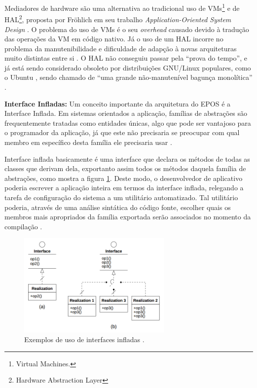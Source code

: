 Mediadores de hardware são uma alternativa ao tradicional uso de VMs\footnote{Virtual Machines.} e de HAL\footnote{Hardware Abstraction Layer}, proposta por Fröhlich em seu trabalho \emph{Application-Oriented System Design} \cite{guto_thesis}. O problema do uso de VMs é o seu \emph{overhead} causado devido à tradução das operações da VM em código nativo. Já o uso de um HAL incorre no problema da manutenibilidade e dificuldade de adapção à novas arquiteturas muito distintas entre si \cite{hw_mediators}. O HAL não conseguiu passar pela ``prova do tempo'', e já está sendo considerado obsoleto por distribuições GNU/Linux populares, como o 
Ubuntu \cite{linux_magazine}, sendo chamado de ``uma grande não-manutenível bagunça monolítica'' \cite{halsectomy}.

\textbf{Interface Infladas: } Um conceito importante da arquitetura do EPOS é a Interface Inflada. %
Em sistemas orientados a aplicação, famílias de abstrações são frequentemente tratadas como entidades únicas, algo que pode ser vantajoso para o programador da aplicação, já que este não precisaria se preocupar com qual membro em específico desta família ele precisaria usar \cite{guto_thesis}.

Interface inflada basicamente é uma interface que declara os métodos de todas as classes que derivam dela, exportanto assim todos os métodos daquela família de abstrações, como mostra a figura \ref{fig:inflated}. Deste modo, o desenvolvedor de aplicativo poderia escrever a aplicação inteira em termos da interface inflada, relegando a tarefa de configuração do sistema a um utilitário automatizado. Tal utilitário poderia, através de uma análise sintática do código fonte, escolher quais os membros mais apropriados da família exportada serão associados no momento da compilação \cite[p.~56]{guto_thesis}.

\begin{figure}[ht!]
	\label{fig:inflated}
    \centering
    \includegraphics[width=7.5cm]{figuras/inflated_interface}
    \caption{Exemplos de uso de interfaces infladas \cite{guto_thesis}.}
\end{figure}


